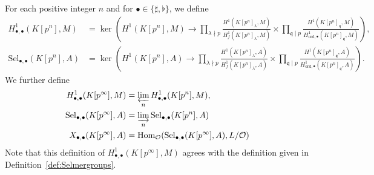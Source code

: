 \documentclass{amsart}
\numberwithin{equation}{section}
\newcommand{\frk}{\mathfrak}
\newcommand{\ord}{\mathrm{ord}}
\newcommand{\Hom}{\mathrm{Hom}}
\newcommand{\Sel}{\mathrm{Sel}}
\begin{document}
\subsubsection{} For each positive integer $n$ and for $\bullet\in\lbrace \sharp,\flat\rbrace$, we define
\begin{align*}
    H^1_{\bullet,\bullet}(K[p^n],M)&=\ker\left(H^1(K[p^n],M)\longrightarrow \prod_{\lambda\nmid p} \frac{H^1(K[p^n]_{\lambda},M)}{H^1_f(K[p^n]_{\lambda},M)}\times \prod_{\frk{q}\mid p} \frac{H^1(K[p^n]_{\frk{q}},M)}{H^1_{\ord,\bullet}(K[p^n]_{\frk{q}},M)}\right), \\
    \Sel_{\bullet,\bullet}(K[p^n],A)&=\ker\left(H^1(K[p^n],A)\longrightarrow \prod_{\lambda\nmid p} \frac{H^1(K[p^n]_{\lambda},A)}{H^1_f(K[p^n]_{\lambda},A)}\times \prod_{\frk{q}\mid p} \frac{H^1(K[p^n]_{\frk{q}},A)}{H^1_{\ord,\bullet}(K[p^n]_{\frk{q}},A)}\right).
\end{align*}
We further define
\begin{align*}
    H^1_{\bullet,\bullet}(K[p^\infty],M)&=\varprojlim_n H^1_{\bullet,\bullet}(K[p^n],M), \\
    \Sel_{\bullet,\bullet}(K[p^\infty],A)&=\varinjlim_n \Sel_{\bullet,\bullet}(K[p^n],A) \\
    X_{\bullet,\bullet}(K[p^\infty],A)&=\Hom_{\mathcal{O}}(\Sel_{\bullet,\bullet}(K[p^\infty],A),L/\mathcal{O})
\end{align*}
Note that this definition of $H^1_{\bullet,\bullet}(K[p^\infty],M)$ agrees with the definition given in Definition~\ref{def:Selmergroups}.
\end{document}
